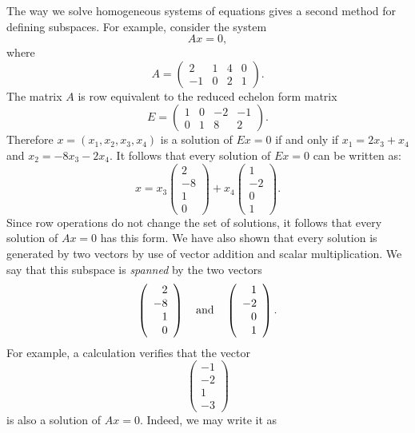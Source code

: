 The way we solve homogeneous systems of equations gives a second
method for defining subspaces.  For example, consider the system
\[
Ax=0,
\]
where
\[
A=\left(\begin{array}{rccc} 2 & 1 & 4 & 0 \\ -1 & 0 & 2 & 1
        \end{array}\right).
\]
The matrix $A$ is row equivalent to the reduced echelon form matrix
\[
E=\left(\begin{array}{ccrr} 1 & 0 & -2 & -1 \\ 0 & 1 & 8 & 2
        \end{array}\right).
\]
Therefore $x=(x_1,x_2,x_3,x_4)$ is a solution of $Ex=0$ if and
only if $x_1 = 2x_3+x_4$ and $x_2 = -8x_3 - 2x_4$.
It follows that every solution of $Ex=0$ can be written as:
\[
x = x_3\left(\begin{array}{r} 2 \\ -8\\ 1\\ 0 \end{array}\right)
+x_4\left(\begin{array}{r} 1 \\ -2\\ 0\\ 1 \end{array}\right).
\]
Since row operations do not change the set of solutions, it
follows that every solution of $Ax=0$ has this form. We have
also shown that every solution is generated by two vectors by
use of vector addition and
scalar multiplication.  We say that
this subspace is {\em spanned\/} by the two vectors
\[
\left(\begin{array}{r} 2 \\ -8\\ 1\\ 0 \end{array}\right)
\quad\mbox{and}\quad
\left(\begin{array}{r} 1 \\ -2\\ 0\\ 1 \end{array}\right).
\]
For example, a calculation verifies that the vector
\[
\left(\begin{array}{r} -1 \\ -2\\ 1\\ -3 \end{array}\right)
\]
is also a solution of $Ax=0$.  Indeed, we may write it as
